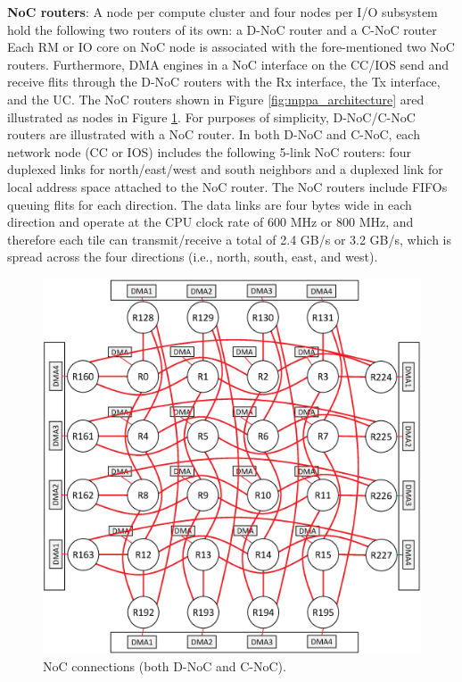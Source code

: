 \documentclass[conference,compsoc]{IEEEtran}
\begin{document}
\textbf{NoC routers}:
A node per compute cluster and four nodes per I/O subsystem hold the following two routers of its own: a D-NoC router and a C-NoC router
Each RM or IO core on NoC node is associated with the fore-mentioned two NoC routers.
Furthermore, DMA engines in a NoC interface on the CC/IOS send and receive flits through the D-NoC routers with the Rx interface, the Tx interface, and the UC.
The NoC routers shown in Figure \ref{fig:mppa_architecture} ared illustrated as nodes in Figure \ref{fig:noc_map}.
For purposes of simplicity, D-NoC/C-NoC routers are illustrated with a NoC router.
In both D-NoC and C-NoC, each network node (CC or IOS)  includes the following 5-link NoC routers:
four duplexed links for north/east/west and south neighbors and a duplexed link for local address space attached to the NoC router.
The NoC routers include FIFOs queuing flits for each direction.
The data links are four bytes wide in each direction and operate at the CPU clock rate of 600 MHz or 800 MHz, and therefore each tile can transmit/receive a total of 2.4 GB/s or 3.2 GB/s, which is spread across the four directions (i.e., north, south, east, and west).

\begin{figure}[t]
  \centering
  \includegraphics[width=0.65\linewidth]{../figure/noc_map.eps}
  \vspace{-4mm}
  \caption{\label{fig:noc_map}
    NoC connections (both D-NoC and C-NoC).}
  \vspace{-5mm}
\end{figure}
\end{document}
